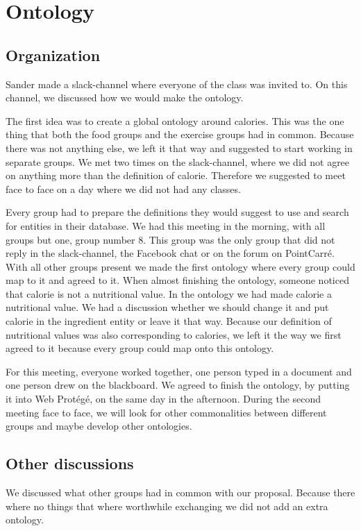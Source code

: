 

\maketitlepage
\section{Ontology}
\subsection{Organization}
Sander made a slack-channel where everyone of the class was invited to. On this channel, we discussed how we would make the ontology. 

The first idea was to create a global ontology around calories. This was the one thing that both the food groups and the exercise groups had in common. Because there was not anything else, we left it that way and suggested to start working in separate groups. 
We met two times on the slack-channel, where we did not agree on anything more than the definition of calorie. Therefore we suggested to meet face to face on a day where we did not had any classes. 

Every group had to prepare the definitions they would suggest to use and search for entities in their database. We had this meeting in the morning, with all groups but one, group number 8. This group was the only group that did not reply in the slack-channel, the Facebook chat or on the forum on PointCarré. With all other groups present we made the first ontology where every group could map to it and agreed to it. When almost finishing the ontology, someone noticed that calorie is not a nutritional value. In the ontology we had made calorie a nutritional value. We had a discussion whether we should change it and put calorie in the ingredient entity or leave it that way. Because our definition of nutritional values was also corresponding to calories, we left it the way we first agreed to it because every group could map onto this ontology. 

For this meeting, everyone worked together, one person typed in a document and one person drew on the blackboard. We agreed to finish the ontology, by putting it into Web Protégé, on the same day in the afternoon. During the second meeting face to face, we will look for other commonalities between different groups and maybe develop other ontologies.
\subsection{Other discussions}
We discussed what other groups had in common with our proposal. Because there where no things that where worthwhile exchanging we did not add an extra ontology.

